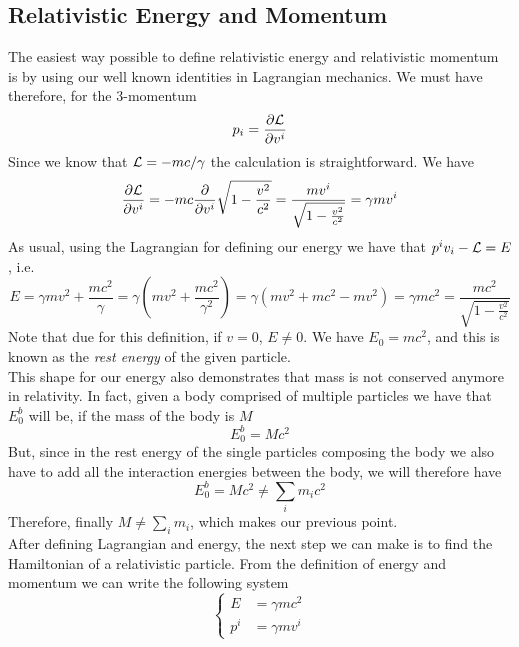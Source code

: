 \documentclass[../admech.tex]{subfiles}
\begin{document}
\subsection{Relativistic Energy and Momentum}
The easiest way possible to define relativistic energy and relativistic momentum is by using our well known identities in Lagrangian mechanics. We must have therefore, for the 3-momentum
\begin{equation}
	p_i=\pdv{\mathcal{L}}{v^i}
	\label{eq:relmom}
\end{equation}
Since we know that $\mathcal{L}=-mc/\gamma$ the calculation is straightforward. We have
\begin{equation*}
	\pdv{\mathcal{L}}{v^i}=-mc\pdv{v^i}\sqrt{1-\frac{v^2}{c^2}}=\frac{mv^i}{\sqrt{1-\frac{v^2}{c^2}}}=\gamma mv^i
\end{equation*}
As usual, using the Lagrangian for defining our energy we have that $p^iv_i-\mathcal{L}=E$, i.e.
\begin{equation}
	E=\gamma mv^2+\frac{mc^2}{\gamma}=\gamma\left( mv^2+\frac{mc^2}{\gamma^2} \right)=\gamma\left( mv^2+mc^2-mv^2 \right)=\gamma mc^2=\frac{mc^2}{\sqrt{1-\frac{v^2}{c^2}}}
	\label{eq:relen}
\end{equation}
Note that due for this definition, if $v=0$, $E\ne0$. We have $E_0=mc^2$, and this is known as the \emph{rest energy} of the given particle.\\
This shape for our energy also demonstrates that mass is not conserved anymore in relativity. In fact, given a body comprised of multiple particles we have that $E_0^{b}$ will be, if the mass of the body is $M$
\begin{equation}
	E_0^b=Mc^2
	\label{eq:restmassbigb}
\end{equation}
But, since in the rest energy of the single particles composing the body we also have to add all the interaction energies between the body, we will therefore have
\begin{equation}
	E_0^b=Mc^2\ne\sum_im_ic^2
	\label{eq:mnoteq}
\end{equation}
Therefore, finally $M\ne\sum_im_i$, which makes our previous point.\\
After defining Lagrangian and energy, the next step we can make is to find the Hamiltonian of a relativistic particle. From the definition of energy and momentum we can write the following system
\begin{equation}
	\left\{ \begin{aligned}
		E&=\gamma mc^2\\
		p^i&=\gamma mv^i
\end{aligned}\right.
	\label{eq:invertlor}
\end{equation}
\end{document}
